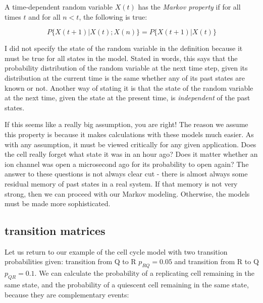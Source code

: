 \documentclass[
  letterpaper,
  DIV=11,
  numbers=noendperiod]{scrreprt}
\begin{document}
\begin{tcolorbox}[enhanced jigsaw, arc=.35mm, colframe=quarto-callout-note-color-frame, left=2mm, opacitybacktitle=0.6, breakable, title=\textcolor{quarto-callout-note-color}{\faInfo}\hspace{0.5em}{Definition}, toprule=.15mm, coltitle=black, bottomtitle=1mm, toptitle=1mm, colback=white, leftrule=.75mm, colbacktitle=quarto-callout-note-color!10!white, titlerule=0mm, opacityback=0, rightrule=.15mm, bottomrule=.15mm]

A time-dependent random variable \(X(t)\) has the \emph{Markov property}
if for all times \(t\) and for all \(n<t\), the following is true:

\[P\{ X(t+1)| X(t) ; X(n) \} = P\{ X(t+1)| X(t) \}\]

\end{tcolorbox}

I did not specify the state of the random variable in the definition
because it must be true for all states in the model. Stated in words,
this says that the probability distribution of the random variable at
the next time step, given its distribution at the current time is the
same whether any of its past states are known or not. Another way of
stating it is that the state of the random variable at the next time,
given the state at the present time, is \emph{independent} of the past
states.

If this seems like a really big assumption, you are right! The reason we
assume this property is because it makes calculations with these models
much easier. As with any assumption, it must be viewed critically for
any given application. Does the cell really forget what state it was in
an hour ago? Does it matter whether an ion channel was open a
microsecond ago for its probability to open again? The answer to these
questions is not always clear cut - there is almost always some residual
memory of past states in a real system. If that memory is not very
strong, then we can proceed with our Markov modeling. Otherwise, the
models must be made more sophisticated.

\hypertarget{transition-matrices}{%
\subsection{transition matrices}\label{transition-matrices}}

Let us return to our example of the cell cycle model with two transition
probabilities given: transition from Q to R \(p_{RQ} = 0.05\) and
transition from R to Q \(p_{QR} = 0.1\). We can calculate the
probability of a replicating cell remaining in the same state, and the
probability of a quiescent cell remaining in the same state, because
they are complementary events:
\end{document}
